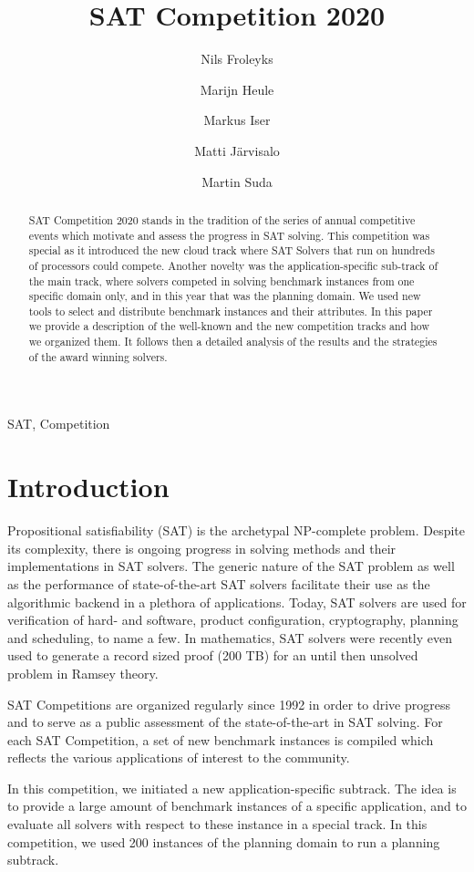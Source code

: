 \documentclass{elsarticle}
\title{SAT Competition 2020\tnoteref{title}}
\author[jku]{Nils Froleyks}
\author[cmu]{Marijn Heule}
\author[kit]{Markus Iser}
\author[hiit]{Matti Järvisalo}
\author[ctu]{Martin Suda}
\begin{document}
\begin{abstract}
SAT Competition 2020 stands in the tradition of the series of annual competitive events which motivate and assess the progress in SAT solving. 
This competition was special as it introduced the new cloud track where SAT Solvers that run on hundreds of processors could compete. 
Another novelty was the application-specific sub-track of the main track, 
where solvers competed in solving benchmark instances from one specific domain only, and in this year that was the planning domain. 
We used new tools to select and distribute benchmark instances and their attributes. 
In this paper we provide a description of the well-known and the new competition tracks and how we organized them. 
It follows then a detailed analysis of the results and the strategies of the award winning solvers. 
\end{abstract}

\begin{keyword}
SAT, Competition
\end{keyword}

\maketitle

\section{Introduction}

Propositional satisfiability (SAT) is the archetypal NP-complete problem. 
Despite its complexity, there is ongoing progress in solving methods and their implementations in SAT solvers. 
The generic nature of the SAT problem as well as the performance of state-of-the-art SAT solvers facilitate their use as the algorithmic backend in a plethora of applications. 
Today, SAT solvers are used for verification of hard- and software, product configuration, cryptography, planning and scheduling, to name a few. 
In mathematics, SAT solvers were recently even used to generate a record sized proof (200 TB) for an until then unsolved problem in Ramsey theory. 

SAT Competitions are organized regularly since 1992 in order to drive progress and to serve as a public assessment of the state-of-the-art in SAT solving. 
For each SAT Competition, a set of new benchmark instances is compiled which reflects the various applications of interest to the community. 

In this competition, we initiated a new application-specific subtrack. 
The idea is to provide a large amount of benchmark instances of a specific application, and to evaluate all solvers with respect to these instance in a special track. 
In this competition, we used 200 instances of the planning domain to run a planning subtrack. 
\end{document}

